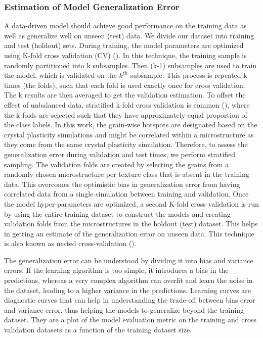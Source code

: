 \documentclass[preprint,1p,times,authoryear]{elsarticle}%
\begin{document}
\subsubsection{Estimation of Model Generalization Error}
A data-driven model should achieve good performance on the training data as well as generalize well on unseen (test) data. We divide our dataset into training and test (holdout) sets. During training, the model parameters are optimized using K-fold cross validation (CV) (\cite{Kohavi2016}). In this technique, the training sample is randomly partitioned into k subsamples. Then (k-1) subsamples are used to train the model, which is validated on the $k^{th}$ subsample. This process is repeated k times (the folds), such that each fold is used exactly once for cross validation. The k results are then averaged to get the validation estimation. To offset the effect of unbalanced data, stratified k-fold cross validation is common (\cite{Parker2007}), where the k-folds are selected such that they have approximately equal proportion of the class labels. In this work, the grain-wise hotspots are designated based on the crystal plasticity simulations and might be correlated within a microstructure as they come from the same crystal plasticity simulation. Therefore, to assess the generalization error during validation and test times, we perform stratified sampling. The validation folds are created by selecting the grains from a randomly chosen microstructure per texture class that is absent in the training data. This overcomes the optimistic bias in generalization error from having correlated data from a single simulation between training and validation. Once the model hyper-parameters are optimized, a second K-fold cross validation is run by using the entire training dataset to construct the models and creating validation folds from the microstructures in the holdout (test) dataset. This helps in getting an estimate of the generalization error on unseen data. This technique is also known as nested cross-validation (\cite{Varma2006}).

The generalization error can be understood by dividing it into bias and variance errors. If the learning algorithm is too simple, it introduces a bias in the predictions, whereas a very complex algorithm can overfit and learn the noise in the dataset, leading to a higher variance in the predictions. Learning curves are diagnostic curves that can help in understanding the trade-off between bias error and variance error, thus helping the models to generalize beyond the training dataset. They are a plot of the model evaluation metric on the training and cross validation datasets as a function of the training dataset size. 
\end{document}
